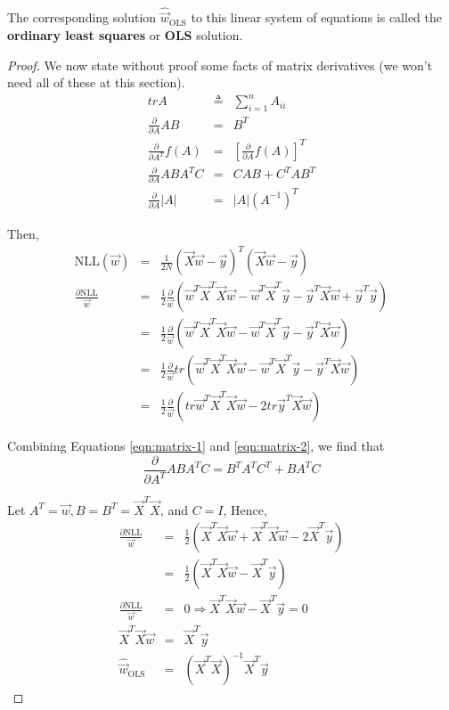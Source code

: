 The corresponding solution $\hat{\vec{w}}_{\mathrm{OLS}}$ to this linear system of equations is called the \textbf{ordinary least squares} or \textbf{OLS} solution.

\begin{proof}
We now state without proof some facts of matrix derivatives (we won’t need all of these at this section).
\begin{eqnarray}
trA &\triangleq& \sum\limits_{i=1}^n A_{ii} \nonumber \\
\frac{\partial}{\partial A}AB &=& B^T \\
\frac{\partial}{\partial A^T}f(A) &=& \left[\frac{\partial}{\partial A}f(A)\right]^T \label{eqn:matrix-1} \\
\frac{\partial}{\partial A}ABA^TC &=& CAB+C^TAB^T \label{eqn:matrix-2} \\
\frac{\partial}{\partial A}|A| &=& |A|(A^{-1})^T
\end{eqnarray}

Then,
\begin{eqnarray*}
\text{NLL}(\vec{w}) &=& \frac{1}{2N}(\vec{X}\vec{w}-\vec{y})^T(\vec{X}\vec{w}-\vec{y}) \\
\frac{\partial \text{NLL}}{\vec{w}} &=& \frac{1}{2} \frac{\partial}{\vec{w}} (\vec{w}^T\vec{X}^T\vec{X}\vec{w}-\vec{w}^T\vec{X}^T\vec{y}-\vec{y}^T\vec{X}\vec{w}+\vec{y}^T\vec{y}) \\
                           &=& \frac{1}{2} \frac{\partial}{\vec{w}} (\vec{w}^T\vec{X}^T\vec{X}\vec{w}-\vec{w}^T\vec{X}^T\vec{y}-\vec{y}^T\vec{X}\vec{w}) \\
						   &=& \frac{1}{2} \frac{\partial}{\vec{w}} tr(\vec{w}^T\vec{X}^T\vec{X}\vec{w}-\vec{w}^T\vec{X}^T\vec{y}-\vec{y}^T\vec{X}\vec{w}) \\
						   &=& \frac{1}{2} \frac{\partial}{\vec{w}} (tr\vec{w}^T\vec{X}^T\vec{X}\vec{w}-2tr\vec{y}^T\vec{X}\vec{w})
\end{eqnarray*}

Combining Equations \ref{eqn:matrix-1} and \ref{eqn:matrix-2}, we find that 
\begin{equation*}
\frac{\partial}{\partial A^T}ABA^TC = B^TA^TC^T+BA^TC
\end{equation*}

Let $A^T=\vec{w}, B=B^T=\vec{X}^T\vec{X}$, and $C=I$, Hence,
\begin{eqnarray}
\frac{\partial \text{NLL}}{\vec{w}} &=& \frac{1}{2} (\vec{X}^T\vec{X}\vec{w}+\vec{X}^T\vec{X}\vec{w} -2\vec{X}^T\vec{y}) \nonumber \\
						   &=& \frac{1}{2} (\vec{X}^T\vec{X}\vec{w} - \vec{X}^T\vec{y}) \nonumber \\
\frac{\partial \text{NLL}}{\vec{w}} &=& 0 \Rightarrow \vec{X}^T\vec{X}\vec{w} - \vec{X}^T\vec{y} =0 \nonumber \\
\vec{X}^T\vec{X}\vec{w} &=& \vec{X}^T\vec{y} \label{eqn:normal-equation} \\
\hat{\vec{w}}_{\mathrm{OLS}} &=& (\vec{X}^T\vec{X})^{-1}\vec{X}^T\vec{y} \nonumber
\end{eqnarray}
\end{proof}

